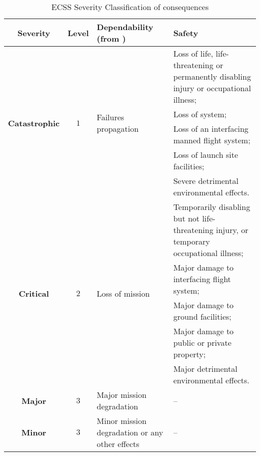 \begin{table}[!ht]
\centering
\noindent \begin{tabular}{|c|c|m{4cm}|m{5cm}|}\hline
\textbf{Severity} & \textbf{Level} & \textbf{Dependability (from \cite{ecss-q-st-30c})} & \textbf{Safety}\\\hline\hline
\multirow{5}{*}{\textbf{Catastrophic}} & \multirow{5}{*}{$1$} & \multirow{5}{*}{Failures propagation} & 
Loss of life, life-threatening or permanently disabling injury or occupational illness;\\\cline{4-4}
& & & Loss of system;  \\ \cline{4-4}
& & & Loss of an interfacing manned flight system; \\ \cline{4-4}
& & & Loss of launch site facilities;  \\ \cline{4-4}
& & & Severe detrimental environmental effects.  \\\hline\hline
\multirow{5}{*}{\textbf{Critical}} & \multirow{5}{*}{$2$} & \multirow{5}{*}{Loss of mission} & 
Temporarily disabling but not life-threatening injury, or temporary occupational illness;\\\cline{4-4}
& & & Major damage to interfacing flight system;  \\ \cline{4-4}
& & & Major damage to ground facilities; \\ \cline{4-4}
& & & Major damage to public or private property;  \\ \cline{4-4}
& & & Major detrimental environmental effects.  \\\hline\hline
\textbf{Major} & $3$ & Major mission degradation & --\\\hline\hline
\textbf{Minor} & $3$ & Minor mission degradation or any other effects & --\\\hline
\end{tabular}
\caption{\protect\ac{ECSS} Severity Classification of consequences}\label{tab:severity}
\end{table}

